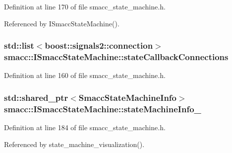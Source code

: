 Definition at line 170 of file smacc\+\_\+state\+\_\+machine.\+h.



Referenced by I\+Smacc\+State\+Machine().

\subsubsection[{\texorpdfstring{state\+Callback\+Connections}{stateCallbackConnections}}]{\setlength{\rightskip}{0pt plus 5cm}std\+::list$<$boost\+::signals2\+::connection$>$ smacc\+::\+I\+Smacc\+State\+Machine\+::state\+Callback\+Connections\hspace{0.3cm}{\ttfamily [private]}}\hypertarget{classsmacc_1_1ISmaccStateMachine_aaf98bb0edaa5d8c84767e4acfad3548d}{}\label{classsmacc_1_1ISmaccStateMachine_aaf98bb0edaa5d8c84767e4acfad3548d}


Definition at line 160 of file smacc\+\_\+state\+\_\+machine.\+h.

\subsubsection[{\texorpdfstring{state\+Machine\+Info\+\_\+}{stateMachineInfo_}}]{\setlength{\rightskip}{0pt plus 5cm}std\+::shared\+\_\+ptr$<${\bf Smacc\+State\+Machine\+Info}$>$ smacc\+::\+I\+Smacc\+State\+Machine\+::state\+Machine\+Info\+\_\+\hspace{0.3cm}{\ttfamily [private]}}\hypertarget{classsmacc_1_1ISmaccStateMachine_a0914aa27c3f51374c338d89a32b135d1}{}\label{classsmacc_1_1ISmaccStateMachine_a0914aa27c3f51374c338d89a32b135d1}


Definition at line 184 of file smacc\+\_\+state\+\_\+machine.\+h.



Referenced by state\+\_\+machine\+\_\+visualization().

